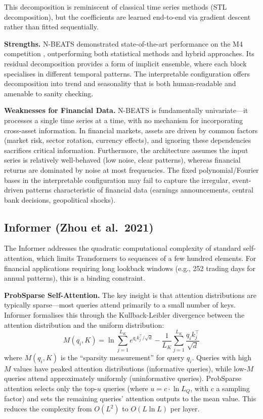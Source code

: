 \documentclass[conference]{IEEEtran}
\begin{document}
This decomposition is reminiscent of classical time series methods (STL decomposition), but the coefficients are learned end-to-end via gradient descent rather than fitted sequentially.

\textbf{Strengths.} N-BEATS demonstrated state-of-the-art performance on the M4 competition \cite{makridakis2020m4}, outperforming both statistical methods and hybrid approaches. Its residual decomposition provides a form of implicit ensemble, where each block specialises in different temporal patterns. The interpretable configuration offers decomposition into trend and seasonality that is both human-readable and amenable to sanity checking.

\textbf{Weaknesses for Financial Data.} N-BEATS is fundamentally univariate---it processes a single time series at a time, with no mechanism for incorporating cross-asset information. In financial markets, assets are driven by common factors (market risk, sector rotation, currency effects), and ignoring these dependencies sacrifices critical information. Furthermore, the architecture assumes the input series is relatively well-behaved (low noise, clear patterns), whereas financial returns are dominated by noise at most frequencies. The fixed polynomial/Fourier bases in the interpretable configuration may fail to capture the irregular, event-driven patterns characteristic of financial data (earnings announcements, central bank decisions, geopolitical shocks).

\subsection{Informer (Zhou et al.\ 2021)}

The Informer \cite{zhou2021informer} addresses the quadratic computational complexity of standard self-attention, which limits Transformers to sequences of a few hundred elements. For financial applications requiring long lookback windows (e.g., 252 trading days for annual patterns), this is a binding constraint.

\textbf{ProbSparse Self-Attention.} The key insight is that attention distributions are typically sparse---most queries attend primarily to a small number of keys. Informer formalises this through the Kullback-Leibler divergence between the attention distribution and the uniform distribution:
\begin{equation}
M(q_i, K) = \ln \sum_{j=1}^{L_K} e^{q_i k_j^\top / \sqrt{d}} - \frac{1}{L_K} \sum_{j=1}^{L_K} \frac{q_i k_j^\top}{\sqrt{d}}
\end{equation}
where $M(q_i, K)$ is the ``sparsity measurement'' for query $q_i$. Queries with high $M$ values have peaked attention distributions (informative queries), while low-$M$ queries attend approximately uniformly (uninformative queries). ProbSparse attention selects only the top-$u$ queries (where $u = c \cdot \ln L_Q$, with $c$ a sampling factor) and sets the remaining queries' attention outputs to the mean value. This reduces the complexity from $O(L^2)$ to $O(L \ln L)$ per layer.
\end{document}
